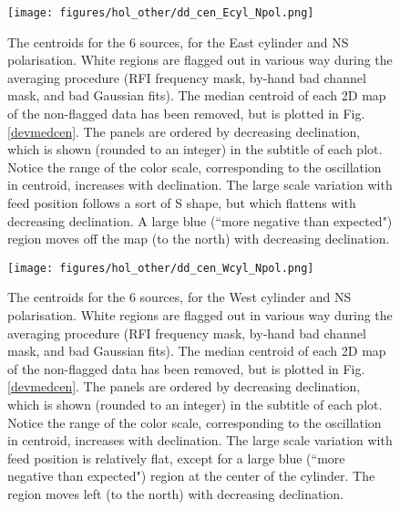 \begin{figure}[h!]
\begin{center}
\texttt{[image: figures/hol\_other/dd\_cen\_Ecyl\_Npol.png]}
\caption{The centroids for the 6 sources, for the East cylinder and NS polarisation. White regions are flagged out in various way during the averaging procedure (RFI frequency mask, by-hand bad channel mask, and bad Gaussian fits). The median centroid of each 2D map of the non-flagged data has been removed, but is plotted in Fig. \ref{devmedcen}. The panels are ordered by decreasing declination, which is shown (rounded to an integer) in the subtitle of each plot. Notice the range of the color scale, corresponding to the oscillation in centroid, increases with declination. The large scale variation with feed position follows a sort of S shape, but which flattens with decreasing declination. A large blue (``more negative than expected") region moves off the map (to the north) with decreasing declination.}
\label{cenEN}
\end{center}
\end{figure}

\begin{figure}[h!]
\begin{center}
\texttt{[image: figures/hol\_other/dd\_cen\_Wcyl\_Npol.png]}
\caption{The centroids for the 6 sources, for the West cylinder and NS polarisation. White regions are flagged out in various way during the averaging procedure (RFI frequency mask, by-hand bad channel mask, and bad Gaussian fits). The median centroid of each 2D map of the non-flagged data has been removed, but is plotted in Fig. \ref{devmedcen}. The panels are ordered by decreasing declination, which is shown (rounded to an integer) in the subtitle of each plot. Notice the range of the color scale, corresponding to the oscillation in centroid, increases with declination. \newline The large scale variation with feed position is relatively flat, except for a large blue (``more negative than expected") region at the center of the cylinder. The region moves left (to the north) with decreasing declination.}
\label{cenWN}
\end{center}
\end{figure}

